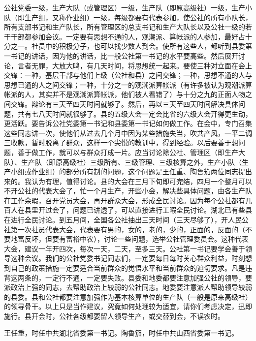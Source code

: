公社党委一级，生产大队（或管理区）一级，生产队（即原高级社）一级，生产小队（即生产组，又称作业组）一级，每级都要有代表参加，使公社的所有小队长，所有支部书记和生产队长，所有管理区的总支书记和生产大队长以及公社一级的若干干部都参加会议。一定要有思想不通的人，观潮派、算帐派的人参加，最好占十分之一。社员中的积极分子，也可以找少数人到会。使所有这些人，都听到县委第一书记的讲话，因为他的讲话，比一般公社第一书记的水平要高些。然后展开讨论，言者无罪，大放大鸣，有几天时间，将思想统一起来。要使三种对立面在会上交锋：一种，基层干部与他们上级（公社和县）之间交锋；一种，思想不通的人与思想已通的人之间交锋；一种，十分之一的观潮派算帐派（有许多被认为观潮派算帐派的人，其实并不是观潮派算帐派，他们被人看错了）与十分之九的正面人物之间交锋。辩论有三天至四天时间就够了。然后，再以三天至四天时间解决具体问题，共有七八天时间就很够了。县的五级大会一定会比省的六级大会开得更生动，更活跃。要告诉公社党委第一书记和县委第一书记如何做工作。在会中，专门召集这些同志讲一次，使他们从过去几个月中因为某些措施失当，吹共产风，一平二调三收款，暂时脱离了群众，这样一个尖悦的教训中，得到经验。以后要善于想问题，善于做工作，就可以与群众打成一片。应当讨论除公社、管理区（即生产大队）、生产队（即原高级社）三级所有、三级管理、三级核算之外，生产小队（生产小组或作业组）的部分所有制的问题，这个问题是王任重、陶鲁笳两位同志提出来的。我认为有理，值得讨论。县的大会在三月下旬即可完结，四月一个整月可以不开公社的代表大会了，忙一个月生产，开些小会，解决些具体问题，由各生产队在工作余暇，召开党员大会，再开群众大会，形成全民讨论。因为每个公社都有几百人在县里开过会了，问题已讲透了，可以直接进行工暇全民讨论。湖北已有些县在进行全民讨论。到五月间，全国各公社抽出三天时间（三天尽够了），开人民公社第一次社员代表大会，代表要有男的，女的，老的，少的，正面的，反面的（不要地富反坏，但要有富裕中农），讨论一些问题，选举公社管理委员会。这种代表大会，建议一年开四次，每次一天，二天，至多三天。公社第一书记要学会善于领导这种会议。我们的公社党委书记同志们，一定要每日每时关心群众利益，时刻想到自己的政策措施一定要适合当前群众的觉悟水平和当前群众的迫切要求。凡是违背这两条的，一定行不通，一定要失败。县委和地委都要注意加强公社的领导，要派政治上强的同志，去帮助政治上较弱的公社同志。地委要注意派人帮助领导较弱的县委。县和公社都要注意加强作为基本核算单位的生产队（一般是原来高级社）的领导骨干。以上只是当作建议，究竟如何处理较为适宜，请你们考虑决定，迅即施行。县开会时，公社各级都要留人领导生产，或交替到会，不误农时。

\begin{maonote}
王任重，时任中共湖北省委第一书记。陶鲁笳，时任中共山西省委第一书记。
\end{maonote}
